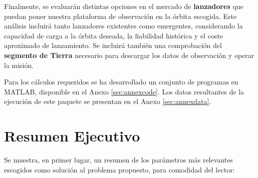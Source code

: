 Finalmente, se evaluarán distintas opciones en el mercado de \textbf{lanzadores} que puedan poner nuestra plataforma de observación en la órbita escogida. Este análisis incluirá tanto lanzadores existentes como emergentes, considerando la capacidad de carga a la órbita deseada, la fiabilidad histórica y el coste aproximado de lanzamiento. Se incluirá también una comprobación del \textbf{segmento de Tierra} necesario para descargar los datos de observación y operar la misión.

Para los cálculos requeridos se ha desarrollado un conjunto de programas en MATLAB, disponible en el Anexo \ref{sec:annexcode}. Los datos resultantes de la ejecución de este paquete se presentan en el Anexo \ref{sec:annexdata}.

\newpage
\section{Resumen Ejecutivo}

Se muestra, en primer lugar, un resumen de los parámetros más relevantes escogidos como solución al problema propuesto, para comodidad del lector:
\hfill \break

